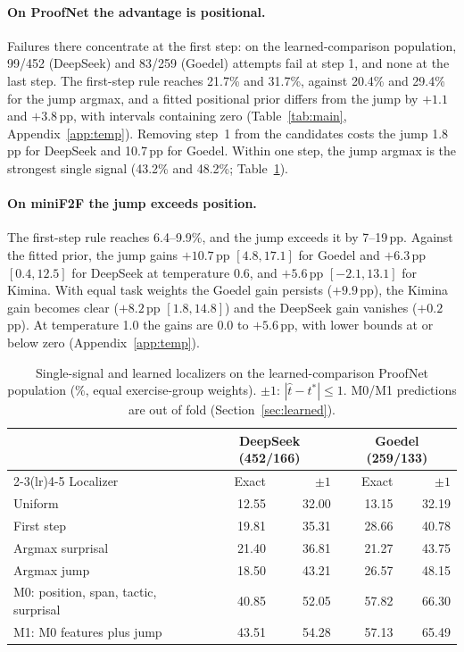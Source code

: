 \paragraph{On ProofNet the advantage is positional.} Failures there concentrate at the first step: on the learned-comparison population, 99/452 (DeepSeek) and 83/259 (Goedel) attempts fail at step 1, and none at the last step. The first-step rule reaches 21.7\% and 31.7\%, against 20.4\% and 29.4\% for the jump argmax, and a fitted positional prior differs from the jump by $+1.1$ and $+3.8$\,pp, with intervals containing zero (Table~\ref{tab:main}, Appendix~\ref{app:temp}). Removing step~1 from the candidates costs the jump 1.8\,pp for DeepSeek and 10.7\,pp for Goedel. Within one step, the jump argmax is the strongest single signal (43.2\% and 48.2\%; Table~\ref{tab:learned}).

\paragraph{On miniF2F the jump exceeds position.} The first-step rule reaches 6.4--9.9\%, and the jump exceeds it by 7--19\,pp. Against the fitted prior, the jump gains $+10.7$\,pp $[4.8, 17.1]$ for Goedel and $+6.3$\,pp $[0.4, 12.5]$ for DeepSeek at temperature 0.6, and $+5.6$\,pp $[-2.1, 13.1]$ for Kimina. With equal task weights the Goedel gain persists ($+9.9$\,pp), the Kimina gain becomes clear ($+8.2$\,pp $[1.8, 14.8]$) and the DeepSeek gain vanishes ($+0.2$\,pp). At temperature 1.0 the gains are $0.0$ to $+5.6$\,pp, with lower bounds at or below zero (Appendix~\ref{app:temp}).

\begin{table}[t]
\caption{Single-signal and learned localizers on the learned-comparison ProofNet population (\%, equal exercise-group weights). $\pm1$: $|\hat t-t^*|\le1$. M0/M1 predictions are out of fold (Section~\ref{sec:learned}).}
\label{tab:learned}
\begin{center}
\begin{tabular}{lrrrr}
\toprule
& \multicolumn{2}{c}{DeepSeek (452/166)} & \multicolumn{2}{c}{Goedel (259/133)}\\
\cmidrule(lr){2-3}\cmidrule(lr){4-5}
Localizer & Exact & $\pm1$ & Exact & $\pm1$\\
\midrule
Uniform & 12.55 & 32.00 & 13.15 & 32.19\\
First step & 19.81 & 35.31 & 28.66 & 40.78\\
Argmax surprisal & 21.40 & 36.81 & 21.27 & 43.75\\
Argmax jump & 18.50 & 43.21 & 26.57 & 48.15\\
M0: position, span, tactic, surprisal & 40.85 & 52.05 & 57.82 & 66.30\\
M1: M0 features plus jump & 43.51 & 54.28 & 57.13 & 65.49\\
\bottomrule
\end{tabular}
\end{center}
\end{table}

